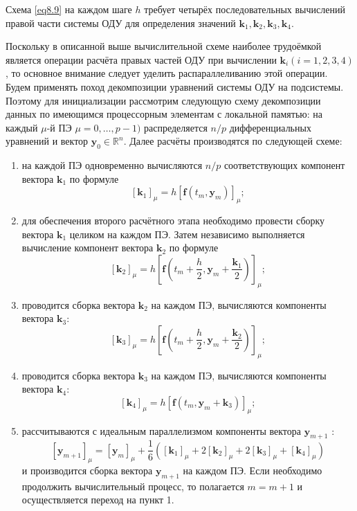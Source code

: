 \documentclass[14pt,final,titlepage,pscyr]{hedwork}
\renewcommand{\vec}[1]{\mathbf{#1}}
\begin{document}
Схема \eqref{eq8.9} на каждом шаге \( h \) требует четырёх последовательных вычислений правой части 
системы ОДУ для определения значений \( \vec{k}_1, \vec{k}_2, \vec{k}_3, \vec{k}_4 \).

Поскольку в описанной выше вычислительной схеме наиболее трудоёмкой является операции расчёта правых 
частей ОДУ при вычислении \( \vec{k}_i (i = 1, 2, 3, 4) \), то основное внимание следует уделить 
распараллеливанию этой операции. Будем применять поход декомпозиции уравнений системы ОДУ на подсистемы. 
Поэтому для инициализации рассмотрим следующую схему декомпозиции данных по имеющимся процессорным 
элементам с локальной памятью: на каждый \( \mu \)-й ПЭ \( \mu = 0, \ldots, p - 1 ) \) распределяется 
\( n/p \) дифференциальных уравнений и вектор \( \vec{y}_0 \in \mathbb{R}^n \). Далее расчёты 
производятся по следующей схеме:
\begin{enumerate}
	\item на каждой ПЭ одновременно вычисляются \( n/p \) соответствующих компонент вектора 
		\( \vec{k}_1 \) по формуле 
		\[ \left[ \vec{k}_1 \right]_\mu = h\left[ \vec{f}(t_m, \vec{y}_m) \right]_\mu; \]
	\item для обеспечения второго расчётного этапа необходимо провести сборку вектора \( \vec{k}_1 \) 
		целиком на каждом ПЭ. Затем независимо выполняется вычисление компонент вектора \( \vec{k}_2 \) 
		по формуле 
	\[ 
		\left[ \vec{k}_2 \right]_\mu = 
			h\left[ 
			\vec{f}(t_m + \frac{h}{2}, \vec{y}_m + \frac{\vec{k}_1}{2}) 
			\right]_\mu; 
	\]
    \item проводится сборка вектора \( \vec{k}_2 \) на каждом ПЭ, вычисляются компоненты вектора 
    	\( \vec{k}_3 \): 
		\[ 
			\left[ \vec{k}_3 \right]_\mu = 
			h\left[ 
				\vec{f}(t_m + \frac{h}{2}, \vec{y}_m + \frac{\vec{k}_2}{2}) 
			\right]_\mu; 
		\]
	\item проводится сборка вектора \( \vec{k}_3 \) на каждом ПЭ, вычисляются компоненты вектора 
		\( \vec{k}_4 \):
		\[ \left[ \vec{k}_4 \right]_\mu = h\left[ \vec{f}(t_m, \vec{y}_m + \vec{k}_3 ) \right]_\mu; \]
		\item рассчитываются с идеальным параллелизмом компоненты вектора \( \vec{y}_{m+1} \) : 
		\[
			\left[ \vec{y}_{m+1} \right]_\mu = \left[ \vec{y}_m \right]_\mu + \frac{1}{6}\left( 
				\left[ \vec{k}_1 \right]_\mu + 2\left[ \vec{k}_2 \right]_\mu + 
				2\left[ \vec{k}_3 \right]_\mu + \left[ \vec{k}_4 \right]_\mu
			\right)
		\]
		и производится сборка вектора \( \vec{y}_{m+1} \) на каждом ПЭ. Если необходимо продолжить 
		вычислительный процесс, то полагается \( m = m + 1 \) и осуществляется переход на пункт 1.
\end{enumerate}
\end{document}
